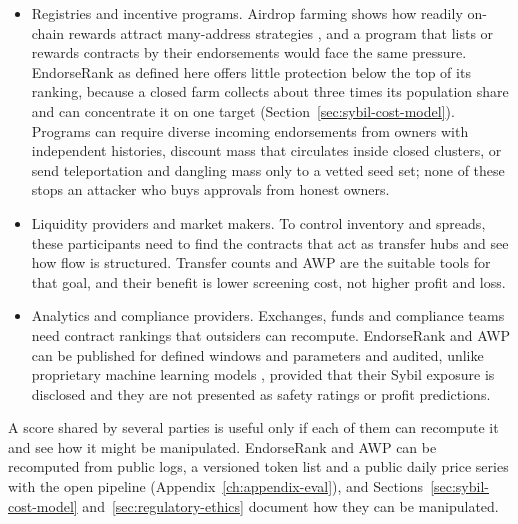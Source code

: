 \begin{itemize}
\item Registries and incentive programs. Airdrop farming shows how readily on-chain rewards attract many-address strategies \parencite{luo2025airdrop}, and a program that lists or rewards contracts by their endorsements would face the same pressure. EndorseRank as defined here offers little protection below the top of its ranking, because a closed farm collects about three times its population share and can concentrate it on one target (Section~\ref{sec:sybil-cost-model}). Programs can require diverse incoming endorsements from owners with independent histories, discount mass that circulates inside closed clusters, or send teleportation and dangling mass only to a vetted seed set; none of these stops an attacker who buys approvals from honest owners.
\item Liquidity providers and market makers. To control inventory and spreads, these participants need to find the contracts that act as transfer hubs and see how flow is structured. Transfer counts and AWP \parencite{do2023awp} are the suitable tools for that goal, and their benefit is lower screening cost, not higher profit and loss.
\item Analytics and compliance providers. Exchanges, funds and compliance teams need contract rankings that outsiders can recompute. EndorseRank and AWP can be published for defined windows and parameters and audited, unlike proprietary machine learning models \parencite{packin2024credit}, provided that their Sybil exposure is disclosed and they are not presented as safety ratings or profit predictions.
\end{itemize}


A score shared by several parties is useful only if each of them can recompute it and see how it might be manipulated. EndorseRank and AWP can be recomputed from public logs, a versioned token list and a public daily price series with the open pipeline (Appendix~\ref{ch:appendix-eval}), and Sections~\ref{sec:sybil-cost-model} and~\ref{sec:regulatory-ethics} document how they can be manipulated.


